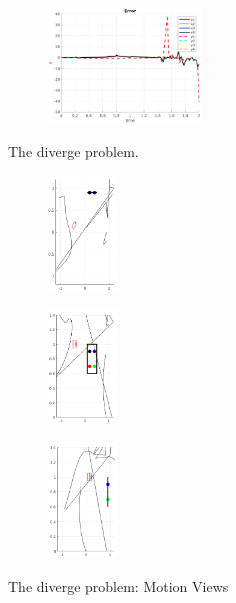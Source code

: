 \documentclass[a4paper,12pt]{article}
\begin{document}
\begin{figure}[t!]
\begin{subfigure}[b]{0.2\textwidth}
		 \end{subfigure}%
         \begin{subfigure}[b]{0.32\textwidth}
        	\centering
	        \includegraphics[height=1.2in]{../results/Demo6-error.png}
		 \end{subfigure}%
         \caption{The diverge problem.} 
 	\label{fig:demo6} 
\end{figure}

\begin{figure}[tb]
         \begin{subfigure}[b]{0.32\textwidth}
        	\centering
	        \includegraphics[height=1.2in]{../results/demo6-XY.png}
		 \end{subfigure}
         \begin{subfigure}[b]{0.2\textwidth}
        	\centering
	        \includegraphics[height=1.2in]{../results/demo6-XZ.png}
		 \end{subfigure}%
         \begin{subfigure}[b]{0.32\textwidth}
        	\centering
	        \includegraphics[height=1.2in]{../results/demo6-YZ.png}
		 \end{subfigure}%
         \caption{The diverge problem: Motion Views} 
 	\label{fig:vdemo6} 
\end{figure}
\FloatBarrier
\end{document}
